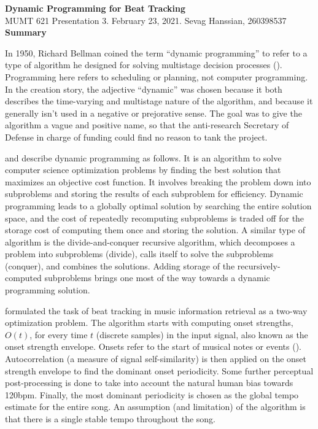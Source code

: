 \documentclass[letter,11pt]{report}
\begin{document}
\noindent\LARGE{\textbf{Dynamic Programming for Beat Tracking}}\\
\Large{MUMT 621 Presentation 3. February 23, 2021. Sevag Hanssian, 260398537}\\

\noindent\Large{\textbf{Summary}}

In 1950, Richard Bellman coined the term ``dynamic programming'' to refer to a type of algorithm he designed for solving multistage decision processes (\cite{bellmanhistory}). Programming here refers to scheduling or planning, not computer programming. In the creation story, the adjective ``dynamic'' was chosen because it both describes the time-varying and multistage nature of the algorithm, and because it generally isn't used in a negative or prejorative sense. The goal was to give the algorithm a vague and positive name, so that the anti-research Secretary of Defense in charge of funding could find no reason to tank the project.

\textcite{skiena} and \textcite{clrs} describe dynamic programming as follows. It is an algorithm to solve computer science optimization problems by finding the best solution that maximizes an objective cost function. It involves breaking the problem down into subproblems and storing the results of each subproblem for efficiency. Dynamic programming leads to a globally optimal solution by searching the entire solution space, and the cost of repeatedly recomputing subproblems is traded off for the storage cost of computing them once and storing the solution. A similar type of algorithm is the divide-and-conquer recursive algorithm, which decomposes a problem into subproblems (divide), calls itself to solve the subproblems (conquer), and combines the solutions. Adding storage of the recursively-computed subproblems brings one most of the way towards a dynamic programming solution.

\textcite{ellis} formulated the task of beat tracking in music information retrieval as a two-way optimization problem. The algorithm starts with computing onset strengths, $O(t)$, for every time $t$ (discrete samples) in the input signal, also known as the onset strength envelope. Onsets refer to the start of musical notes or events (\cite{onsets}). Autocorrelation (a measure of signal self-similarity) is then applied on the onset strength envelope to find the dominant onset periodicity. Some further perceptual post-processing is done to take into account the natural human bias towards 120bpm. Finally, the most dominant periodicity is chosen as the global tempo estimate for the entire song. An assumption (and limitation) of the algorithm is that there is a single stable tempo throughout the song.
\end{document}
